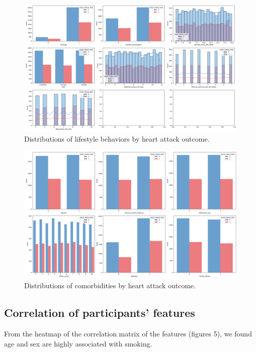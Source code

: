\documentclass{article}
\begin{document}
\begin{figure}
\centering
\includegraphics[width=1\linewidth]{figures/lifestyle_behaviors.png}
\caption{\label{fig:lifestyle_behaviors} Distributions of lifestyle behaviors by heart attack outcome.}
\end{figure}


\begin{figure}
\centering
\includegraphics[width=1\linewidth]{figures/comorbidities.png}
\caption{\label{fig:comorbidities} Distributions of comorbidities by heart attack outcome.}
\end{figure}


\subsection{Correlation of participants' features}
From the heatmap of the correlation matrix of the features (figures 5), we found age and sex are highly associated with smoking.
\end{document}
